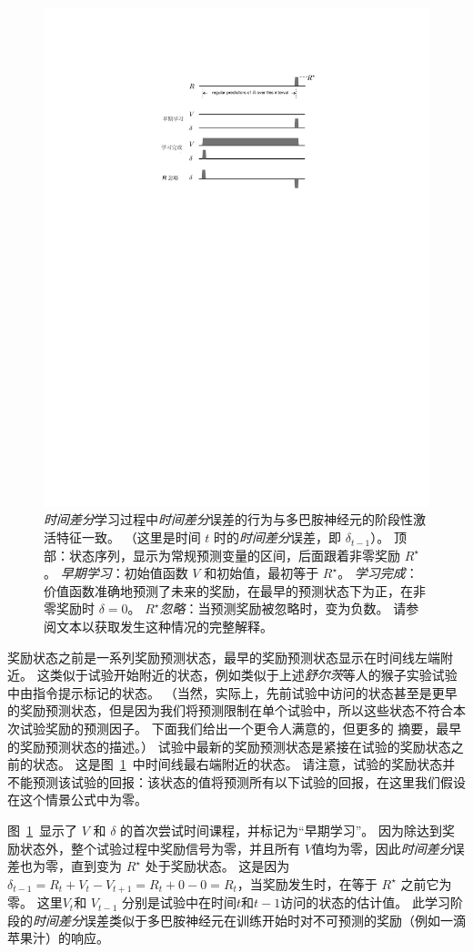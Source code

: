 \begin{figure}[!htb]
	\centering
	\includegraphics[width=0.5\linewidth]{chap12/fig_12_5}
	\caption{\textit{时间差分}学习过程中\textit{时间差分}误差的行为与多巴胺神经元的阶段性激活特征一致。
		（这里是时间 $t$ 时的\textit{时间差分}误差，即 $\delta_{t-1}$）。
		顶部：状态序列，显示为常规预测变量的区间，后面跟着非零奖励 $R^{\star}$。
		\textit{早期学习}：初始值函数 $V$ 和初始值，最初等于 $R^{\star}$。
		\textit{学习完成}：价值函数准确地预测了未来的奖励，在最早的预测状态下为正，在非零奖励时 $\delta = 0$。
		\textit{$R^{\star}$忽略}：当预测奖励被忽略时，变为负数。
		请参阅文本以获取发生这种情况的完整解释。
		\label{fig:12_5}}
\end{figure}


奖励状态之前是一系列奖励预测状态，最早的奖励预测状态显示在时间线左端附近。
这类似于试验开始附近的状态，例如类似于上述\textit{舒尔茨}等人\cite{schultz1993responses}的猴子实验试验中由指令提示标记的状态。
（当然，实际上，先前试验中访问的状态甚至是更早的奖励预测状态，但是因为我们将预测限制在单个试验中，所以这些状态不符合本次试验奖励的预测因子。
下面我们给出一个更令人满意的，但更多的 摘要，最早的奖励预测状态的描述。）
试验中最新的奖励预测状态是紧接在试验的奖励状态之前的状态。
这是图~\ref{fig:12_5}~中时间线最右端附近的状态。
请注意，试验的奖励状态并不能预测该试验的回报：该状态的值将预测所有以下试验的回报，在这里我们假设在这个情景公式中为零。


图~\ref{fig:12_5}~显示了 $V$ 和 $\delta$ 的首次尝试时间课程，并标记为“早期学习”。 
因为除达到奖励状态外，整个试验过程中奖励信号为零，并且所有 $V$值均为零，因此\textit{时间差分}误差也为零，直到变为 $R^{\star}$ 处于奖励状态。
这是因为 $\delta_{t-1} = R_t + V_t - V_{t+1} = R_t + 0 - 0 = R_t$，当奖励发生时，在等于 $R^{\star}$ 之前它为零。
这里$V_t$和 $V_{t-1}$ 分别是试验中在时间$t$和$t-1$访问的状态的估计值。
此学习阶段的\textit{时间差分}误差类似于多巴胺神经元在训练开始时对不可预测的奖励（例如一滴苹果汁）的响应。



